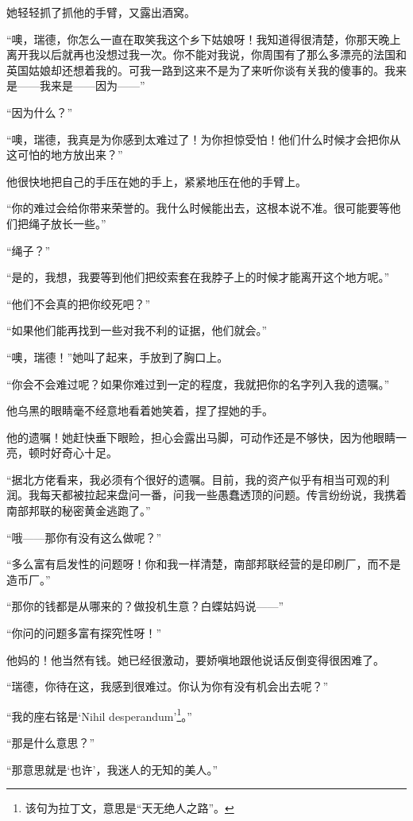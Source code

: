 \par 她轻轻抓了抓他的手臂，又露出酒窝。
\par “噢，瑞德，你怎么一直在取笑我这个乡下姑娘呀！我知道得很清楚，你那天晚上离开我以后就再也没想过我一次。你不能对我说，你周围有了那么多漂亮的法国和英国姑娘却还想着我的。可我一路到这来不是为了来听你谈有关我的傻事的。我来是——我来是——因为——”
\par “因为什么？”
\par “噢，瑞德，我真是为你感到太难过了！为你担惊受怕！他们什么时候才会把你从这可怕的地方放出来？”
\par 他很快地把自己的手压在她的手上，紧紧地压在他的手臂上。
\par “你的难过会给你带来荣誉的。我什么时候能出去，这根本说不准。很可能要等他们把绳子放长一些。”
\par “绳子？”
\par “是的，我想，我要等到他们把绞索套在我脖子上的时候才能离开这个地方呢。”
\par “他们不会真的把你绞死吧？”
\par “如果他们能再找到一些对我不利的证据，他们就会。”
\par “噢，瑞德！”她叫了起来，手放到了胸口上。
\par “你会不会难过呢？如果你难过到一定的程度，我就把你的名字列入我的遗嘱。”
\par 他乌黑的眼睛毫不经意地看着她笑着，捏了捏她的手。
\par 他的遗嘱！她赶快垂下眼睑，担心会露出马脚，可动作还是不够快，因为他眼睛一亮，顿时好奇心十足。
\par “据北方佬看来，我必须有个很好的遗嘱。目前，我的资产似乎有相当可观的利润。我每天都被拉起来盘问一番，问我一些愚蠢透顶的问题。传言纷纷说，我携着南部邦联的秘密黄金逃跑了。”
\par “哦——那你有没有这么做呢？”
\par “多么富有启发性的问题呀！你和我一样清楚，南部邦联经营的是印刷厂，而不是造币厂。”
\par “那你的钱都是从哪来的？做投机生意？白蝶姑妈说——”
\par “你问的问题多富有探究性呀！”
\par 他妈的！他当然有钱。她已经很激动，要娇嗔地跟他说话反倒变得很困难了。
\par “瑞德，你待在这，我感到很难过。你认为你有没有机会出去呢？”
\par “我的座右铭是‘Nihil desperandum'\footnote{该句为拉丁文，意思是“天无绝人之路”。}。”
\par “那是什么意思？”
\par “那意思就是‘也许’，我迷人的无知的美人。”
